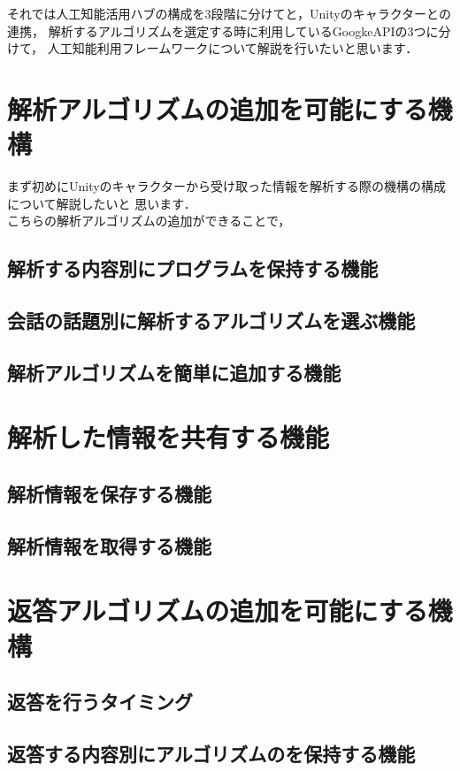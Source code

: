それでは人工知能活用ハブの構成を3段階に分けてと，Unityのキャラクターとの連携，
解析するアルゴリズムを選定する時に利用しているGoogkeAPIの3つに分けて，
人工知能利用フレームワークについて解説を行いたいと思います．
\\
\section{解析アルゴリズムの追加を可能にする機構}
まず初めにUnityのキャラクターから受け取った情報を解析する際の機構の構成について解説したいと
思います．\\
こちらの解析アルゴリズムの追加ができることで，
\subsection{解析する内容別にプログラムを保持する機能}
\subsection{会話の話題別に解析するアルゴリズムを選ぶ機能}
\subsection{解析アルゴリズムを簡単に追加する機能}

\section{解析した情報を共有する機能}
\subsection{解析情報を保存する機能}
\subsection{解析情報を取得する機能}

\section{返答アルゴリズムの追加を可能にする機構}
\subsection{返答を行うタイミング}
\subsection{返答する内容別にアルゴリズムのを保持する機能}
